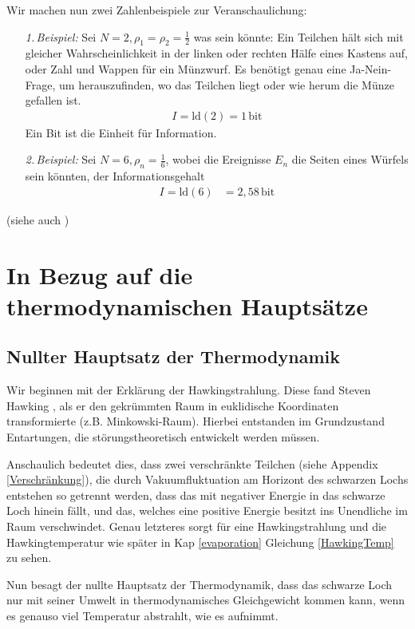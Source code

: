 \documentclass[ngerman]{scrartcl}
\begin{document}
Wir machen nun zwei Zahlenbeispiele zur Veranschaulichung:
	\begin{itemize}
		\item[\textit{1.\,Beispiel:}] Sei $N=2, \rho_1 = \rho_2= \frac{1}{2}$ was sein könnte: Ein Teilchen hält sich mit gleicher Wahrscheinlichkeit in der linken oder rechten Hälfe eines Kastens auf, oder Zahl und Wappen für ein Münzwurf.
		Es benötigt genau eine Ja-Nein-Frage, um herauszufinden, wo das Teilchen liegt oder wie herum die Münze gefallen ist.
			\begin{align*}
				I = \mathrm{ld}(2) = 1 \,\mathrm{bit}
			\end{align*}
		Ein Bit ist die Einheit für Information.
		\item[\textit{2.\,Beispiel:}]Sei $N=6, \rho_n = \frac{1}{6}$, wobei die Ereignisse $E_n$ die Seiten eines Würfels sein könnten, der Informationsgehalt
			\begin{align*}
				I = \mathrm{ld}(6) &= 2,58 \,\mathrm{bit}
			\end{align*}
	\end{itemize}
(siehe auch \cite{Brenig})

\section{In Bezug auf die thermodynamischen Hauptsätze}
	\subsection{Nullter Hauptsatz der Thermodynamik}
	Wir beginnen mit der Erklärung der Hawkingstrahlung. Diese fand Steven Hawking \cite{ParticleCreation}, als er den gekrümmten Raum in euklidische Koordinaten transformierte (z.B. Minkowski-Raum). Hierbei entstanden im Grundzustand Entartungen, die störungstheoretisch entwickelt werden müssen. 
	
	Anschaulich bedeutet dies, dass zwei verschränkte Teilchen (siehe Appendix \ref{Verschränkung}), die durch Vakuumfluktuation am Horizont des schwarzen Lochs entstehen so getrennt werden, dass das mit negativer Energie in das schwarze Loch hinein fällt, und das, welches eine positive Energie besitzt ins Unendliche im Raum verschwindet. 
	Genau letzteres sorgt für eine Hawkingstrahlung und die Hawkingtemperatur wie später in Kap \ref{evaporation} Gleichung \eqref{HawkingTemp} zu sehen.
	
	Nun besagt der nullte Hauptsatz der Thermodynamik, dass das schwarze Loch nur mit seiner Umwelt in thermodynamisches Gleichgewicht kommen kann, wenn es genauso viel Temperatur abstrahlt, wie es aufnimmt. 
	
\end{document}
